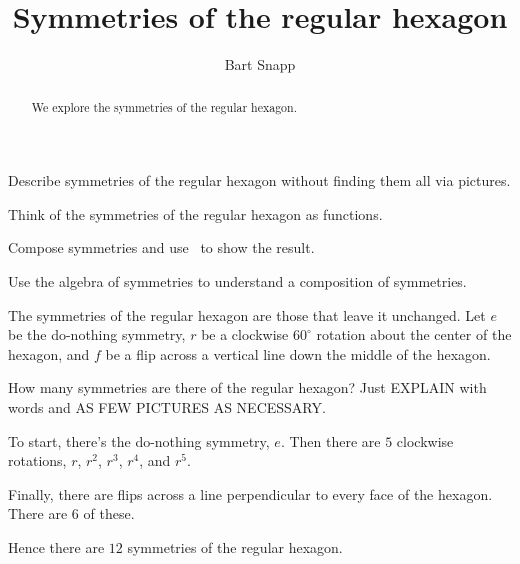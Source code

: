 \documentclass[noauthor,nooutcomes,12pt,hints,handout]{ximera}
\title{Symmetries of the regular hexagon}
\author{Bart Snapp}
\begin{document}
\begin{abstract}
  We explore the symmetries of the regular hexagon.
\end{abstract}
\maketitle

\begin{listOutcomes}
\item Describe symmetries of the regular hexagon without finding them
  all via pictures.
\item Think of the symmetries of the regular hexagon as functions.
\item Compose symmetries and use \snap\ to show the result.
\item Use the algebra of symmetries to understand a composition of
  symmetries.
\end{listOutcomes}
\mynewpage


\begin{question}
  The symmetries of the regular hexagon are those that leave it
  unchanged. Let $e$ be the do-nothing symmetry, $r$ be a clockwise
  $60^\circ$ rotation about the center of the hexagon, and $f$ be a
  flip across a vertical line down the middle of the hexagon.

  
  How many symmetries are there of the regular hexagon? Just
  EXPLAIN with words and AS FEW PICTURES AS NECESSARY.
  \begin{freeResponse}
    To start, there's the do-nothing symmetry, $e$. Then there are
    $5$ clockwise rotations, $r$, $r^2$, $r^3$, $r^4$, and $r^5$.

    Finally, there are flips across a line perpendicular to every face
    of the hexagon. There are $6$ of these.

    Hence there are $12$ symmetries of the regular hexagon.
  \end{freeResponse}
\end{question}
\mynewpage
\end{document}

